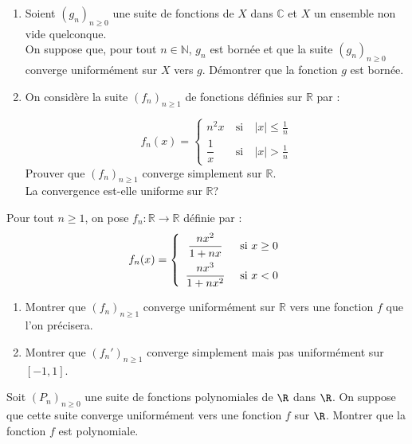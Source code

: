 \documentclass[a4paper,twoside,french,11pt]{VcCours}
\begin{document}
\begin{Exercice}{} 
\begin{enumerate}

\item Soient $(g_n)_{n \geq 0}$ une suite de fonctions de $X$ dans $\mathbb{C}$ et $X$ un ensemble non vide quelconque.\\
On suppose que, pour tout $n\in \mathbb{N}$, $g_n$ est bornée et que la suite $(g_n)_{n \geq 0}$ converge uniformément sur $X$ vers $g$. Démontrer que la fonction  $g$ est bornée.
\item
On considère la suite  $(f_n)_{n \geq 1}$ de fonctions  définies sur $\mathbb{R}$ par : 

$$f_n(x)=\left\lbrace \begin{array}{lll}
n^2x&\:\text{si}\:&|x|\leq \frac{1}{n}\\[0.3cm]
\dfrac{1}{x}&\:\text{si}\:&|x|>\frac{1}{n}
\end{array}\right.$$
Prouver que $(f_n)_{n \geq 1}$  converge simplement sur $\mathbb{R}$.\\
La convergence est-elle uniforme sur $\mathbb{R}$?

\end{enumerate}
\end{Exercice}


\newpage
\begin{Exercice}{} Pour tout $n \geq 1$, on pose $f_n : \mathbb{R} \rightarrow \mathbb{R}$ définie par :
$$ f_n(x)= \left\lbrace \begin{array}{cl}
\dfrac{nx^2}{1+nx} & \hbox{ si } x \geq 0 \\[0.3cm]
\dfrac{nx^3}{1+nx^2} & \hbox{ si } x < 0 \\
\end{array}\right.$$
\begin{enumerate}
\item Montrer que $(f_n)_{n \geq 1}$ converge uniformément sur $\mathbb{R}$ vers une fonction $f$ que l'on précisera.
\item Montrer que $(f_n')_{n \geq 1}$ converge simplement mais pas uniformément sur $[-1,1]$.
\end{enumerate}
\end{Exercice}




\begin{Exercice}[$\bigstar$] Soit $(P_{n})_{n \geq 0}$ une suite de fonctions polynomiales de $\R$ dans $\R$. On suppose que cette suite converge uniformément vers une fonction $f$ sur $\R$. Montrer que la fonction $f$ est polynomiale.
\end{Exercice}
\end{document}
